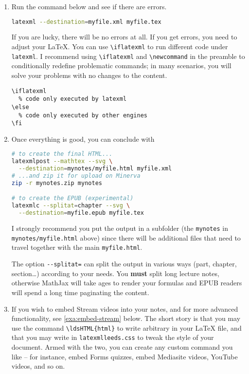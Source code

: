 \documentclass[a4paper]{article}
\def\ltxinline{\lstinline[style=latexml]}
\theoremstyle{definition}
\begin{document}
\begin{enumerate}
\begin{lstlisting}[style=latexml]
% to improve the HTML style, \ldsHTML and other goodies
% load *after* loading all the other packages
\usepackage{latexmlleeds}
  \end{lstlisting}
  to your preamble. You should load \verb|latexmlleeds| \emph{after} loading all the other packages.
  \item Run the command below and see if there are errors.
  \begin{lstlisting}[language=bash]
latexml --destination=myfile.xml myfile.tex
  \end{lstlisting}
  If you are lucky, there will be no errors at all. If you get errors, you need to adjust your \LaTeX{}. You can use \ltxinline|\iflatexml| to run different code under \verb|latexml|. I recommend using \ltxinline|\iflatexml| and \ltxinline|\newcommand| in the preamble to conditionally redefine problematic commands; in many scenarios, you will solve your problems with no changes to the content.
  \begin{lstlisting}[style=latexml]
\iflatexml
  % code only executed by latexml
\else
  % code only executed by other engines
\fi
  \end{lstlisting}
  \item Once everything is good, you can conclude with
  \begin{lstlisting}[language=bash]
# to create the final HTML...
latexmlpost --mathtex --svg \
  --destination=mynotes/myfile.html myfile.xml
# ...and zip it for upload on Minerva
zip -r mynotes.zip mynotes

# to create the EPUB (experimental)
latexmlc --splitat=chapter --svg \
  --destination=myfile.epub myfile.tex
  \end{lstlisting}
  I strongly recommend you put the output in a subfolder (the \verb|mynotes| in \verb|mynotes/myfile.html| above) since there will be additional files that need to travel together with the main \verb|myfile.html|.

  The option \verb|--splitat=| can split the output in various ways (part, chapter, section\dots{}) according to your needs. You \textbf{must} split long lecture notes, otherwise MathJax will take ages to render your formulas and EPUB readers will spend a long time paginating the content.
  \item If you wish to embed Stream videos into your notes, and for more advanced functionality, see \autoref{exa:embed-stream} below. The short story is that you may use the command \ltxinline|\ldsHTML{html}| to write arbitrary \HTML{} in your \LaTeX{} file, and that you may write in \verb|latexmlleeds.css| to tweak the style of your document. Armed with the two, you can create any custom command you like -- for instance, embed Forms quizzes, embed Mediasite videos, YouTube videos, and so on.
\end{enumerate}
\end{document}
